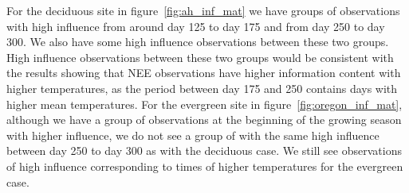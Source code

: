\documentclass[11pt]{article}
\begin{document}
For the deciduous site in figure~\ref{fig:ah_inf_mat} we have groups of observations with high influence from around day 125 to day 175 and from day 250 to day 300. We also have some high influence observations between these two groups. High influence observations between these two groups would be consistent with the results showing that NEE observations have higher information content with higher temperatures, as the period between day 175 and 250 contains days with higher mean temperatures. For the evergreen site in figure~\ref{fig:oregon_inf_mat}, although we have a group of observations at the beginning of the growing season with higher influence, we do not see a group of with the same high influence between day 250 to day 300 as with the deciduous case. We still see observations of high influence corresponding to times of higher temperatures for the evergreen case. 
\end{document}
